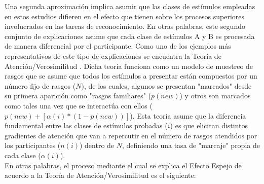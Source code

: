 Una segunda aproximación implica asumir que las clases de estímulos empleadas en estos estudios difieren en el efecto que tienen sobre los procesos superiores involucrados en las tareas de reconocimiento. En otras palabras, este segundo conjunto de explicaciones asume que cada clase de estímulos A y B es procesada de manera diferencial por el participante. Como uno de los ejemplos más representativos de este tipo de explicaciones se encuentra la Teoría de Atención/Verosimilitud \parencite{Glanzer1993}. Dicha teoría funciona como un modelo de muestreo de rasgos que se asume que todos los estímulos a presentar están compuestos por un número fijo de rasgos ($N$), de los cuales, algunos se presentan "marcados" desde su primera aparición como "rasgos familiares" ($p(new)$) y otros son marcados como tales una vez que se interactúa con ellos ($p(new) + [\alpha(i)* (1-p(new))]$). Esta teoría asume que la diferencia fundamental entre  las clases de estímulos probadas ($i$) es que elicitan distintos gradientes de atención que van a repercutir en el número de rasgos atendidos por los participantes ($n(i)$) dentro de $N$, definiendo una tasa de  "marcaje" propia de cada clase ($\alpha(i)$).\\

En otras palabras, el proceso mediante el cual se explica el Efecto Espejo de acuerdo a la Teoría de Atención/Verosimilitud es el siguiente:\\

